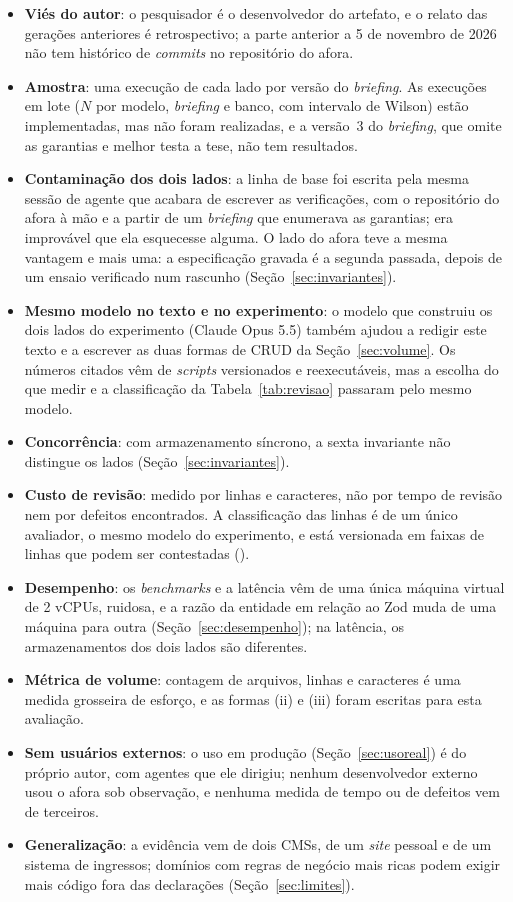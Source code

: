 \documentclass[a4paper,12pt]{article}
\newcommand{\estr}[1]{\textit{#1}}
\begin{document}
\begin{itemize}
  \item \textbf{Viés do autor}: o pesquisador é o desenvolvedor do artefato, e o relato das gerações anteriores é retrospectivo; a parte anterior a 5 de novembro de 2026 não tem histórico de \estr{commits} no repositório do afora.
  \item \textbf{Amostra}: uma execução de cada lado por versão do \estr{briefing}. As execuções em lote ($N$ por modelo, \estr{briefing} e banco, com intervalo de Wilson) estão implementadas, mas não foram realizadas, e a versão~3 do \estr{briefing}, que omite as garantias e melhor testa a tese, não tem resultados.
  \item \textbf{Contaminação dos dois lados}: a linha de base foi escrita pela mesma sessão de agente que acabara de escrever as verificações, com o repositório do afora à mão e a partir de um \estr{briefing} que enumerava as garantias; era improvável que ela esquecesse alguma. O lado do afora teve a mesma vantagem e mais uma: a especificação gravada é a segunda passada, depois de um ensaio verificado num rascunho (Seção~\ref{sec:invariantes}).
  \item \textbf{Mesmo modelo no texto e no experimento}: o modelo que construiu os dois lados do experimento (Claude Opus 5.5) também ajudou a redigir este texto e a escrever as duas formas de CRUD da Seção~\ref{sec:volume}. Os números citados vêm de \estr{scripts} versionados e reexecutáveis, mas a escolha do que medir e a classificação da Tabela~\ref{tab:revisao} passaram pelo mesmo modelo.
  \item \textbf{Concorrência}: com armazenamento síncrono, a sexta invariante não distingue os lados (Seção~\ref{sec:invariantes}).
  \item \textbf{Custo de revisão}: medido por linhas e caracteres, não por tempo de revisão nem por defeitos encontrados. A classificação das linhas é de um único avaliador, o mesmo modelo do experimento, e está versionada em faixas de linhas que podem ser contestadas ().
  \item \textbf{Desempenho}: os \estr{benchmarks} e a latência vêm de uma única máquina virtual de 2 vCPUs, ruidosa, e a razão da entidade em relação ao Zod muda de uma máquina para outra (Seção~\ref{sec:desempenho}); na latência, os armazenamentos dos dois lados são diferentes.
  \item \textbf{Métrica de volume}: contagem de arquivos, linhas e caracteres é uma medida grosseira de esforço, e as formas (ii) e (iii) foram escritas para esta avaliação.
  \item \textbf{Sem usuários externos}: o uso em produção (Seção~\ref{sec:usoreal}) é do próprio autor, com agentes que ele dirigiu; nenhum desenvolvedor externo usou o afora sob observação, e nenhuma medida de tempo ou de defeitos vem de terceiros.
  \item \textbf{Generalização}: a evidência vem de dois CMSs, de um \estr{site} pessoal e de um sistema de ingressos; domínios com regras de negócio mais ricas podem exigir mais código fora das declarações (Seção~\ref{sec:limites}).
\end{itemize}
\end{document}
